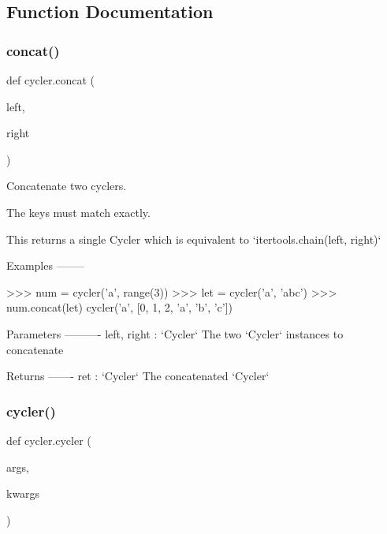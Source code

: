 \subsection{Function Documentation}
\mbox{\label{namespacecycler_ad5661339f84cea158df28b2b2064e045}} 
\subsubsection{\texorpdfstring{concat()}{concat()}}
{\footnotesize\ttfamily def cycler.\+concat (\begin{DoxyParamCaption}\item[{}]{left,  }\item[{}]{right }\end{DoxyParamCaption})}

\begin{DoxyVerb}Concatenate two cyclers.

The keys must match exactly.

This returns a single Cycler which is equivalent to
`itertools.chain(left, right)`

Examples
--------

>>> num = cycler('a', range(3))
>>> let = cycler('a', 'abc')
>>> num.concat(let)
cycler('a', [0, 1, 2, 'a', 'b', 'c'])

Parameters
----------
left, right : `Cycler`
    The two `Cycler` instances to concatenate

Returns
-------
ret : `Cycler`
    The concatenated `Cycler`
\end{DoxyVerb}
 \mbox{\label{namespacecycler_a52e235843070faa367f50dd1159a7afd}} 
\subsubsection{\texorpdfstring{cycler()}{cycler()}}
{\footnotesize\ttfamily def cycler.\+cycler (\begin{DoxyParamCaption}\item[{}]{args,  }\item[{}]{kwargs }\end{DoxyParamCaption})}

